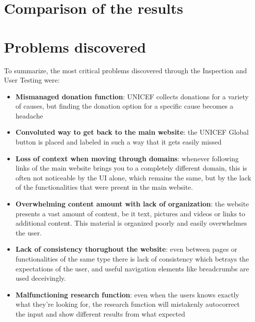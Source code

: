 \section{Comparison of the results}




\section{Problems discovered}
To summarize, the most critical problems discovered through the Inspection and User Testing were:
\begin{itemize}
    \item \textbf{Mismanaged donation function}: UNICEF collects donations for a variety of causes, but finding the donation option for a specific cause becomes a headache
    \item \textbf{Convoluted way to get back to the main website}: the UNICEF Global button is placed and labeled in such a way that it gets easily missed
    \item \textbf{Loss of context when moving through domains}: whenever following links of the main website brings you to a completely different domain, this is often not noticeable by the UI alone, which remains the same, but by the lack of the functionalities that were preent in the main website.
    \item \textbf{Overwhelming content amount with lack of organization}: the website presents a vast amount of content, be it text, pictures and videos or links to additional content. This material is organized poorly and easily overwhelmes the user.
    \item \textbf{Lack of consistency thorughout the website}: even between pages or functionalities of the same type there is lack of consistency which betrays the expectations of the user, and useful navigation elements like breadcrumbs are used deceivingly.
    \item \textbf{Malfunctioning research function}: even when the users knows exactly what they're looking for, the research function will mistakenly autocorrect the input and show different results from what expected
\end{itemize}

